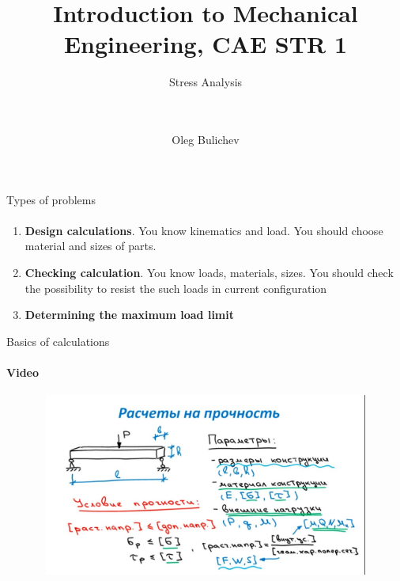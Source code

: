 \documentclass[aspectratio=169]{beamer}
\title[IME]{Introduction to Mechanical Engineering, CAE STR 1} %
\subtitle{Stress Analysis
\\ \  \\ \ 
    } %
\author{Oleg Bulichev}
\newcommand{\fbckg}[1]{\usebackgroundtemplate{\texttt{[image: \#1]}}}%
\begin{document}
\setlength{\abovedisplayskip}{0pt}
\setlength{\belowdisplayskip}{0pt}
\setlength{\abovedisplayshortskip}{0pt}
\setlength{\belowdisplayshortskip}{0pt}

\fbckg{fibeamer/figs/title_page.png}

\fbckg{fibeamer/figs/common.png}

\note{\scriptsize
\ 
}

\begin{frame}[t]{Types of problems}
\framesubtitle{}
    \begin{enumerate}
        \item \textbf{Design calculations}. You know kinematics and load. You should choose material and sizes of parts.
        \item \textbf{Checking calculation}. You know loads, materials, sizes. You should check the possibility to resist the such loads in current configuration
        \item \textbf{Determining the maximum load limit} 
    \end{enumerate}
\end{frame}

\begin{frame}[t]{Basics of calculations}
    \framesubtitle{Video}
    \vspace{-0.6cm}
    \begin{figure}[H]
        \href{https://youtu.be/dfUYvLLUpwI}{
            \centering\includegraphics[height=6cm,width=1\textwidth,keepaspectratio]{basics_video.jpg}}
        \label{fig:basics_video.jpg}
    \end{figure}
\end{frame}
\end{document}
